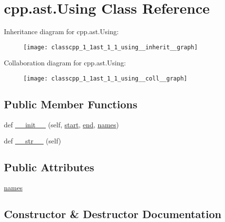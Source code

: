 \hypertarget{classcpp_1_1ast_1_1_using}{}\section{cpp.\+ast.\+Using Class Reference}
\label{classcpp_1_1ast_1_1_using}


Inheritance diagram for cpp.\+ast.\+Using\+:
\nopagebreak
\begin{figure}[H]
\begin{center}
\leavevmode
\texttt{[image: classcpp\_1\_1ast\_1\_1\_using\_\_inherit\_\_graph]}
\end{center}
\end{figure}


Collaboration diagram for cpp.\+ast.\+Using\+:
\nopagebreak
\begin{figure}[H]
\begin{center}
\leavevmode
\texttt{[image: classcpp\_1\_1ast\_1\_1\_using\_\_coll\_\_graph]}
\end{center}
\end{figure}
\subsection*{Public Member Functions}
\begin{DoxyCompactItemize}
\item 
def \hyperlink{classcpp_1_1ast_1_1_using_a9b7a760a06d00f7211c889d9841e06af}{\+\_\+\+\_\+init\+\_\+\+\_\+} (self, \hyperlink{classcpp_1_1ast_1_1_node_a7b2aa97e6a049bb1a93aea48c48f1f44}{start}, \hyperlink{classcpp_1_1ast_1_1_node_a3c5e5246ccf619df28eca02e29d69647}{end}, \hyperlink{classcpp_1_1ast_1_1_using_abc05dedb59eb83857d373cc0e64eccb3}{names})
\item 
def \hyperlink{classcpp_1_1ast_1_1_using_ac209e8e5d84988d14a8f4b30377e5455}{\+\_\+\+\_\+str\+\_\+\+\_\+} (self)
\end{DoxyCompactItemize}
\subsection*{Public Attributes}
\begin{DoxyCompactItemize}
\item 
\hyperlink{classcpp_1_1ast_1_1_using_abc05dedb59eb83857d373cc0e64eccb3}{names}
\end{DoxyCompactItemize}


\subsection{Constructor \& Destructor Documentation}
